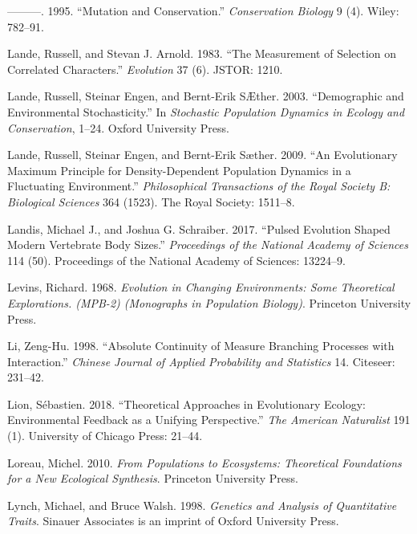 \documentclass[]{article}
\begin{document}
\leavevmode\hypertarget{ref-Lande1995}{}%
---------. 1995. ``Mutation and Conservation.'' \emph{Conservation
Biology} 9 (4). Wiley: 782--91.

\leavevmode\hypertarget{ref-Lande1983}{}%
Lande, Russell, and Stevan J. Arnold. 1983. ``The Measurement of
Selection on Correlated Characters.'' \emph{Evolution} 37 (6). JSTOR:
1210.

\leavevmode\hypertarget{ref-Lande2003}{}%
Lande, Russell, Steinar Engen, and Bernt-Erik SÆther. 2003.
``Demographic and Environmental Stochasticity.'' In \emph{Stochastic
Population Dynamics in Ecology and Conservation}, 1--24. Oxford
University Press.

\leavevmode\hypertarget{ref-Lande2009}{}%
Lande, Russell, Steinar Engen, and Bernt-Erik Sæther. 2009. ``An
Evolutionary Maximum Principle for Density-Dependent Population Dynamics
in a Fluctuating Environment.'' \emph{Philosophical Transactions of the
Royal Society B: Biological Sciences} 364 (1523). The Royal Society:
1511--8.

\leavevmode\hypertarget{ref-Landis2017}{}%
Landis, Michael J., and Joshua G. Schraiber. 2017. ``Pulsed Evolution
Shaped Modern Vertebrate Body Sizes.'' \emph{Proceedings of the National
Academy of Sciences} 114 (50). Proceedings of the National Academy of
Sciences: 13224--9.

\leavevmode\hypertarget{ref-9780691080628}{}%
Levins, Richard. 1968. \emph{Evolution in Changing Environments: Some
Theoretical Explorations. (MPB-2) (Monographs in Population Biology)}.
Princeton University Press.

\leavevmode\hypertarget{ref-zeng1998absolute}{}%
Li, Zeng-Hu. 1998. ``Absolute Continuity of Measure Branching Processes
with Interaction.'' \emph{Chinese Journal of Applied Probability and
Statistics} 14. Citeseer: 231--42.

\leavevmode\hypertarget{ref-Lion2018}{}%
Lion, Sébastien. 2018. ``Theoretical Approaches in Evolutionary Ecology:
Environmental Feedback as a Unifying Perspective.'' \emph{The American
Naturalist} 191 (1). University of Chicago Press: 21--44.

\leavevmode\hypertarget{ref-michelloreau2010}{}%
Loreau, Michel. 2010. \emph{From Populations to Ecosystems: Theoretical
Foundations for a New Ecological Synthesis}. Princeton University Press.

\leavevmode\hypertarget{ref-michaellynch1998}{}%
Lynch, Michael, and Bruce Walsh. 1998. \emph{Genetics and Analysis of
Quantitative Traits}. Sinauer Associates is an imprint of Oxford
University Press.
\end{document}
